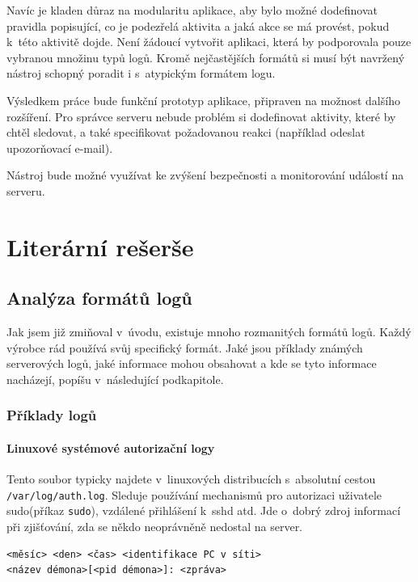 \documentclass[thesis=B,czech]{FITthesis}[2012/06/26]
\begin{document}
Navíc je kladen důraz na modularitu aplikace, aby bylo možné dodefinovat pravidla popisující, co je podezřelá aktivita a jaká akce se má provést, pokud k~této aktivitě dojde. Není žádoucí vytvořit aplikaci, která by podporovala pouze vybranou množinu typů logů. Kromě nejčastějších formátů si musí být navržený nástroj schopný poradit i s~atypickým formátem logu.

Výsledkem práce bude funkční prototyp aplikace, připraven na možnost dalšího rozšíření. Pro správce serveru nebude problém si dodefinovat aktivity, které by chtěl sledovat, a také specifikovat požadovanou reakci (například odeslat upozorňovací e-mail).

Nástroj bude možné využívat ke zvýšení bezpečnosti a monitorování událostí na serveru. 

\chapter{Literární rešerše}
\section{Analýza formátů logů}
Jak jsem již zmiňoval v~úvodu, existuje mnoho rozmanitých formátů logů. Každý výrobce rád používá svůj specifický formát. Jaké jsou příklady známých serverových logů, jaké informace mohou obsahovat a kde se tyto informace nacházejí, popíšu v~následující podkapitole. 

\subsection{Příklady logů}

\subsubsection{Linuxové systémové autorizační logy}
Tento soubor typicky najdete v~linuxových distribucích s~absolutní cestou \texttt{/var/log/auth.log}. Sleduje používání mechanismů pro autorizaci uživatele sudo(příkaz \texttt{sudo}), vzdálené přihlášení k~sshd atd. Jde o~dobrý zdroj informací při zjišťování, zda se někdo neoprávněně nedostal na server. \cite{linuxLogFiles}

\begin{lstlisting}[frame=single,caption=Formát události z~linuxového autorizačního logu \cite{linuxLogFiles},label=formatAUTH]
<měsíc> <den> <čas> <identifikace PC v síti> 
<název démona>[<pid démona>]: <zpráva>
\end{lstlisting}
\end{document}
